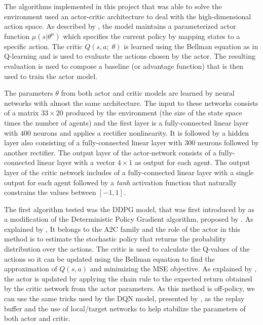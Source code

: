 \documentclass[a4paper]{article}
\begin{document}

The algorithms implemented in this project that was able to solve the environment used an actor-critic architecture to deal with the high-dimensional action space. As described by \cite{Lillicrap:2015ww}, the model maintains a parameterized actor function $\mu(s | \theta^{\mu})$ which specifies the current policy by mapping states to a specific action. The critic $Q(s, a; \;\theta)$ is learned using the Bellman equation as in Q-learning and is used to evaluate the actions chosen by the actor. The resulting evaluation is used to compose a baseline (or advantage function) that is then used to train the actor model. 
 
 The parameters $\theta$ from both actor and critic models are learned by neural networks with almost the same architecture. The input to these networks consists of a matrix $33 \times 20$ produced by the environment (the size of the state space times the number of agents) and the first layer is a fully-connected linear layer with $400$ neurons and applies a rectifier nonlinearity. It is followed by a hidden layer also consisting of a fully-connected linear layer with $300$ neurons followed by another rectifier. The output layer of the actor-network consists of a fully-connected linear layer with a vector $4\times1$ as output for each agent. The output layer of the critic network includes of a fully-connected linear layer with a single output for each agent followed by a \textit{tanh} activation function that naturally constrains the values between $[-1, 1]$.


The first algorithm tested was the DDPG model, that was first introduced by \cite{Lillicrap:2015ww} as a modification of the Deterministic Policy Gradient algorithm, proposed by \cite{Silver:wt}. As explained by \cite{lapan2018deep}, It belongs to the A2C family and the role of the actor in this method is to estimate the stochastic policy that returns the probability distribution over the actions. The critic is used to calculate the Q-values of the actions so it can be updated using the Bellman equation to find the approximation of $Q(s, a)$ and minimizing the MSE objective. As explained by \cite{Lillicrap:2015ww}, the actor is updated by applying the chain rule to the expected return obtained by the critic network from the actor parameters. As this method is off-policy, we can use the same tricks used by the DQN model, presented by \cite{mnih2015humanlevel}, as the replay buffer and the use of local/target networks to help stabilize the parameters of both actor and critic.
\end{document}
